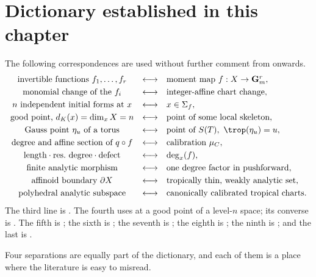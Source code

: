 \section{Dictionary established in this chapter}
\label{sec:trop-dictionary-closing}

The following correspondences are used without further comment from
 onwards.
\begingroup
\setlength{\arraycolsep}{2pt}
\[
\begin{array}{ccl}
\text{invertible functions }f_1,\ldots,f_r
 &\longleftrightarrow&
 \text{moment map }f:X\to\mathbf G_m^r,\\[1mm]
\text{monomial change of the }f_i
 &\longleftrightarrow&
 \text{integer-affine chart change},\\[1mm]
\text{$n$ independent initial forms at }x
 &\longleftrightarrow&
 x\in\Sigma_f,\\[1mm]
\text{good point, }d_K(x)=\dim_xX=n
 &\longleftrightarrow&
 \text{point of some local skeleton},\\[1mm]
\text{Gauss point }\eta_u\text{ of a torus}
 &\longleftrightarrow&
 \text{point of }S(T),\ \trop(\eta_u)=u,\\[1mm]
\text{degree and affine section of }q\circ f
 &\longleftrightarrow&
 \text{calibration }\mu_C,\\[1mm]
\text{length}\cdot\text{res.\ degree}\cdot\text{defect}
 &\longleftrightarrow&
 \deg_x(f),\\[1mm]
\text{finite analytic morphism}
 &\longleftrightarrow&
 \text{one degree factor in pushforward},\\[1mm]
\text{affinoid boundary }\partial X
 &\longleftrightarrow&
 \text{tropically thin, weakly analytic set},\\[1mm]
\text{polyhedral analytic subspace}
 &\longleftrightarrow&
 \text{canonically calibrated tropical charts}.
\end{array}
\]
\endgroup
The third line is . The fourth uses
 at a good point of a level-$n$ space;
its converse is . The fifth is
; the
sixth is ; the seventh is
; the eighth is
; the ninth is
; and the last is
.

Four separations are equally part of the dictionary, and each of them is a
place where the literature is easy to misread.

